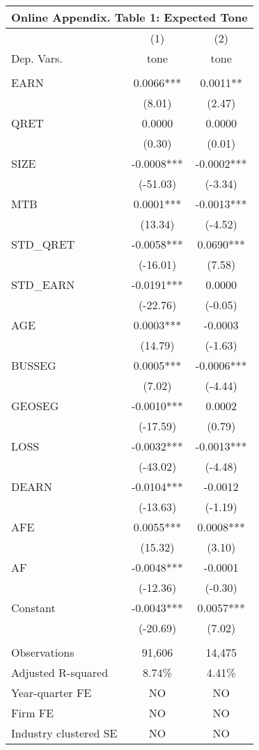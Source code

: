 \begin{table}[htbp] \label{oat1}
  \centering
    \begin{tabular}{lcc}
    \multicolumn{3}{c}{\textbf{Online Appendix. Table 1: Expected Tone}} \\
    \midrule
    \midrule
      & (1) & (2) \\
    Dep. Vars. & tone & tone \\
    \midrule
      &   &  \\
    EARN & 0.0066*** & 0.0011** \\
      & (8.01) & (2.47) \\
    QRET & 0.0000 & 0.0000 \\
      & (0.30) & (0.01) \\
    SIZE &-0.0008*** &-0.0002*** \\
      & (-51.03) & (-3.34) \\
    MTB &0.0001*** &-0.0013*** \\
      & (13.34) & (-4.52) \\
    STD\_QRET & -0.0058*** & 0.0690*** \\
      & (-16.01) & (7.58) \\
    STD\_EARN & -0.0191*** & 0.0000 \\
      & (-22.76) & (-0.05) \\
    AGE & 0.0003*** & -0.0003 \\
      & (14.79) & (-1.63) \\
    BUSSEG & 0.0005*** & -0.0006***\\
      & (7.02) & (-4.44) \\
    GEOSEG & -0.0010*** & 0.0002 \\
      & (-17.59) & (0.79) \\
    LOSS &-0.0032*** &-0.0013*** \\
      & (-43.02) & (-4.48) \\
    DEARN & -0.0104*** & -0.0012 \\
      & (-13.63) & (-1.19) \\
    AFE & 0.0055*** & 0.0008*** \\
      & (15.32) & (3.10) \\
    AF & -0.0048*** & -0.0001 \\
      & (-12.36) & (-0.30) \\
    Constant & -0.0043*** & 0.0057*** \\
      & (-20.69) & (7.02) \\
      &   &  \\
    Observations & 91,606 & 14,475 \\
    Adjusted R-squared & 8.74\% & 4.41\% \\
    Year-quarter FE & NO & NO \\
    Firm FE & NO & NO \\
    Industry clustered SE & NO & NO \\
    \bottomrule
    \bottomrule
    \end{tabular}%
\end{table}%
